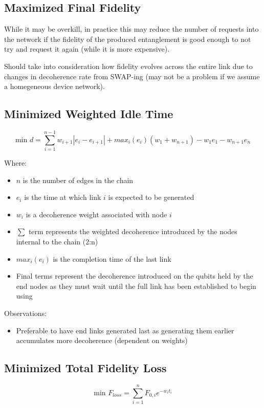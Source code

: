 \documentclass{article}
\begin{document}
\subsection{Maximized Final Fidelity}
While it may be overkill, in practice this may reduce the number of requests into the network if the fidelity of the produced entanglement is good enough to not try and request it again (while it is more expensive).

Should take into consideration how fidelity evolves across the entire link due to changes in decoherence rate from SWAP-ing (may not be a problem if we assume a homegeneous device network).

\subsection{Minimized Weighted Idle Time}

    $$\text{min } d = \sum_{i=1}^{n-1} w_{i+1}|e_i - e_{i+1}| + max_i(e_i)(w_1 + w_{n+1}) - w_1e_1 - w_{n+1}e_n$$

Where:
\begin{itemize}
    \item $n$ is the number of edges in the chain
    \item $e_i$ is the time at which link $i$ is expected to be generated
    \item $w_i$ is a decoherence weight associated with node $i$
    \item $\sum$ term represents the weighted decoherence introduced by the nodes internal to the chain (2:n)
    \item $max_i(e_i)$ is the completion time of the last link
    \item Final terms represent the decoherence introduced on the qubits held by the end nodes as they must wait until the full link has been established to begin using
\end{itemize}

Observations:
\begin{itemize}
    \item Preferable to have end links generated last as generating them earlier accumulates more decoherence (dependent on weights)
\end{itemize}

\subsection{Minimized Total Fidelity Loss}

$$\text{min } F_{loss} = \sum_{i=1}^{n} F_{0,i}e^{-w_it_i}$$
\end{document}
